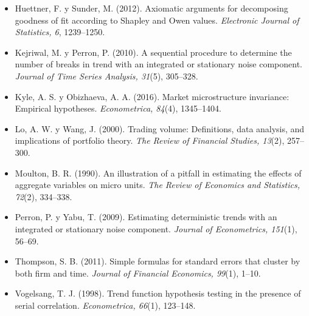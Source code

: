 \documentclass[11pt,letterpaper]{article}
\theoremstyle{definition}
\theoremstyle{plain}
\begin{document}
\begin{itemize}[leftmargin=*,label={}]
\item Huettner, F. y Sunder, M. (2012). Axiomatic arguments for decomposing goodness of fit according to Shapley and Owen values. \emph{Electronic Journal of Statistics, 6}, 1239--1250.
\item Kejriwal, M. y Perron, P. (2010). A sequential procedure to determine the number of breaks in trend with an integrated or stationary noise component. \emph{Journal of Time Series Analysis, 31}(5), 305--328.
\item Kyle, A. S. y Obizhaeva, A. A. (2016). Market microstructure invariance: Empirical hypotheses. \emph{Econometrica, 84}(4), 1345--1404.
\item Lo, A. W. y Wang, J. (2000). Trading volume: Definitions, data analysis, and implications of portfolio theory. \emph{The Review of Financial Studies, 13}(2), 257--300.
\item Moulton, B. R. (1990). An illustration of a pitfall in estimating the effects of aggregate variables on micro units. \emph{The Review of Economics and Statistics, 72}(2), 334--338.
\item Perron, P. y Yabu, T. (2009). Estimating deterministic trends with an integrated or stationary noise component. \emph{Journal of Econometrics, 151}(1), 56--69.
\item Thompson, S. B. (2011). Simple formulas for standard errors that cluster by both firm and time. \emph{Journal of Financial Economics, 99}(1), 1--10.
\item Vogelsang, T. J. (1998). Trend function hypothesis testing in the presence of serial correlation. \emph{Econometrica, 66}(1), 123--148.
\end{itemize}
\end{document}
